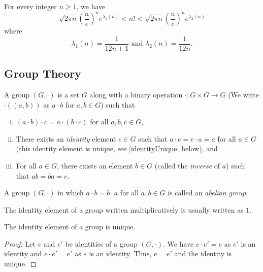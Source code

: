 
\begin{theorem}
\label{stirlingApproximation}
    For every integer $n\geq 1$, we have
    $$\sqrt{2\pi n}\left(\frac{n}{e}\right)^ne^{\lambda_1(n)}< n!< \sqrt{2\pi n}\left(\frac{n}{e}\right)^ne^{\lambda_2(n)}$$
    where
    $$\lambda_1(n)=\frac{1}{12n+1}\text{ and }\lambda_2(n)=\frac{1}{12n}.$$
\end{theorem}

\clearpage

\subsection{Group Theory}

\begin{definition}
    A group $(G,\cdot)$ is a set $G$ along with a binary operation $\cdot:G\times G\to G$ (We write $\cdot((a,b))$ as $a\cdot b$ for $a,b\in G$) such that
    \begin{enumerate}[(i)]
        \item $(a\cdot b)\cdot c=a\cdot(b\cdot c)$ for all $a,b,c\in G$,
        \item There exists an \textit{identity} element $e\in G$ such that $a\cdot e=e\cdot a=a$ for all $a\in G$ (this identity element is unique, see \ref{identityUnique} below), and
        \item For all $a\in G$, there exists an element $b\in G$ (called the \textit{inverse} of $a$) such that $ab=ba=e$.
    \end{enumerate}
\end{definition}

A group $(G,\cdot)$ in which $a\cdot b=b\cdot a$ for all $a,b\in G$ is called an \textit{abelian group}.

The identity element of a group written multiplicatively is usually written as $1$.

\begin{theorem}
\label{identityUnique}
    The identity element of a group is unique.
\end{theorem}
\begin{proof}
    Let $e$ and $e'$ be identities of a group $(G,\cdot)$. We have $e\cdot e'=e$ as $e'$ is an identity and $e\cdot e'=e'$ as $e$ is an identity. Thus, $e=e'$ and the identity is unique.
\end{proof}

